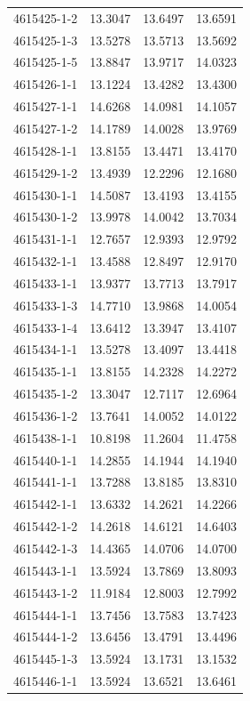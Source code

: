 \begin{longtable}{lrrr}
4615425-1-2 & 13.3047 & 13.6497 & 13.6591 \\
4615425-1-3 & 13.5278 & 13.5713 & 13.5692 \\
4615425-1-5 & 13.8847 & 13.9717 & 14.0323 \\
4615426-1-1 & 13.1224 & 13.4282 & 13.4300 \\
4615427-1-1 & 14.6268 & 14.0981 & 14.1057 \\
4615427-1-2 & 14.1789 & 14.0028 & 13.9769 \\
4615428-1-1 & 13.8155 & 13.4471 & 13.4170 \\
4615429-1-2 & 13.4939 & 12.2296 & 12.1680 \\
4615430-1-1 & 14.5087 & 13.4193 & 13.4155 \\
4615430-1-2 & 13.9978 & 14.0042 & 13.7034 \\
4615431-1-1 & 12.7657 & 12.9393 & 12.9792 \\
4615432-1-1 & 13.4588 & 12.8497 & 12.9170 \\
4615433-1-1 & 13.9377 & 13.7713 & 13.7917 \\
4615433-1-3 & 14.7710 & 13.9868 & 14.0054 \\
4615433-1-4 & 13.6412 & 13.3947 & 13.4107 \\
4615434-1-1 & 13.5278 & 13.4097 & 13.4418 \\
4615435-1-1 & 13.8155 & 14.2328 & 14.2272 \\
4615435-1-2 & 13.3047 & 12.7117 & 12.6964 \\
4615436-1-2 & 13.7641 & 14.0052 & 14.0122 \\
4615438-1-1 & 10.8198 & 11.2604 & 11.4758 \\
4615440-1-1 & 14.2855 & 14.1944 & 14.1940 \\
4615441-1-1 & 13.7288 & 13.8185 & 13.8310 \\
4615442-1-1 & 13.6332 & 14.2621 & 14.2266 \\
4615442-1-2 & 14.2618 & 14.6121 & 14.6403 \\
4615442-1-3 & 14.4365 & 14.0706 & 14.0700 \\
4615443-1-1 & 13.5924 & 13.7869 & 13.8093 \\
4615443-1-2 & 11.9184 & 12.8003 & 12.7992 \\
4615444-1-1 & 13.7456 & 13.7583 & 13.7423 \\
4615444-1-2 & 13.6456 & 13.4791 & 13.4496 \\
4615445-1-3 & 13.5924 & 13.1731 & 13.1532 \\
4615446-1-1 & 13.5924 & 13.6521 & 13.6461 \\

\end{longtable}
